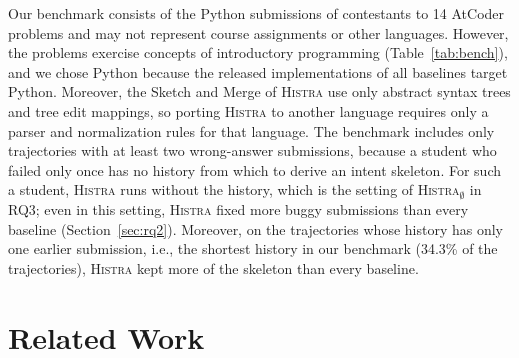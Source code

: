 \documentclass[10pt,conference]{IEEEtran}
\begin{document}
Our benchmark consists of the Python submissions of contestants to 14 AtCoder problems and may not represent course assignments or other languages. However, the problems exercise concepts of introductory programming (Table~\ref{tab:bench}), and we chose Python because the released implementations of all baselines target Python. Moreover, the Sketch and Merge of \textsc{Histra} use only abstract syntax trees and tree edit mappings, so porting \textsc{Histra} to another language requires only a parser and normalization rules for that language. The benchmark includes only trajectories with at least two wrong-answer submissions, because a student who failed only once has no history from which to derive an intent skeleton. For such a student, \textsc{Histra} runs without the history, which is the setting of \textsc{Histra}$_{\emptyset}$ in RQ3; even in this setting, \textsc{Histra} fixed more buggy submissions than every baseline (Section~\ref{sec:rq2}). Moreover, on the trajectories whose history has only one earlier submission, i.e., the shortest history in our benchmark (34.3\% of the trajectories), \textsc{Histra} kept more of the skeleton than every baseline.

\section{Related Work}\label{sec:related}
\end{document}

